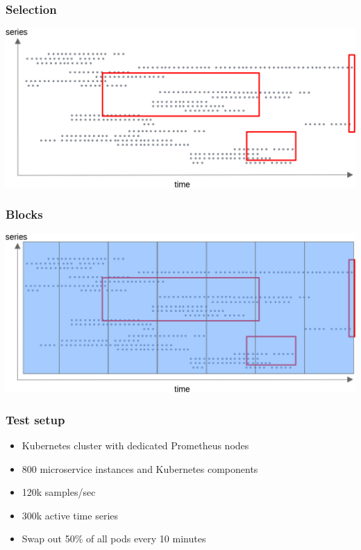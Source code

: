 \documentclass[aspectratio=169]{beamer}
\begin{document}
\begin{frame}
	\frametitle{Selection}
	\includegraphics[width=\textwidth]{storage--file_per_series_with_selection.png}
\end{frame}

\begin{frame}
	\frametitle{Blocks}
	\includegraphics[width=\textwidth]{storage--block_with_selection.png}
\end{frame}


\begin{frame}
	\frametitle{Test setup}
	\begin{itemize}
		\item Kubernetes cluster with dedicated Prometheus nodes
		\item 800 microservice instances and Kubernetes components
		\item 120k samples/sec
		\item 300k active time series
		\item Swap out 50\% of all pods every 10 minutes
	\end{itemize}
\end{frame}
\end{document}
